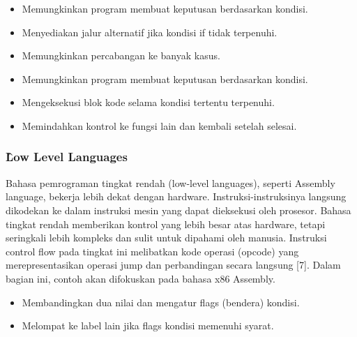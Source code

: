 
\begin{itemize}
	\item {} Memungkinkan program membuat keputusan berdasarkan kondisi.
	\item {} Menyediakan jalur alternatif jika kondisi if tidak terpenuhi.
	\item {} Memungkinkan percabangan ke banyak kasus.
\end{itemize}


\begin{itemize}
	\item {} Memungkinkan program membuat keputusan berdasarkan kondisi.
	\item {} Mengeksekusi blok kode selama kondisi tertentu terpenuhi.
\end{itemize}


\begin{itemize}
	\item {} Memindahkan kontrol ke fungsi lain dan kembali setelah selesai.
\end{itemize}

\subsubsection{\f{Low Level Languages}}
Bahasa pemrograman tingkat rendah (low-level languages), seperti Assembly language, bekerja lebih dekat dengan hardware. Instruksi-instruksinya langsung dikodekan ke dalam instruksi mesin yang dapat dieksekusi oleh prosesor. Bahasa tingkat rendah memberikan kontrol yang lebih besar atas hardware, tetapi seringkali lebih kompleks dan sulit untuk dipahami oleh manusia. Instruksi control flow pada tingkat ini melibatkan kode operasi (opcode) yang merepresentasikan operasi jump dan perbandingan secara langsung [7]. Dalam bagian ini, contoh akan difokuskan pada bahasa x86 Assembly.


\begin{itemize}
	\item {} Membandingkan dua nilai dan mengatur flags (bendera) kondisi.
	\item {} Melompat ke label lain jika flags kondisi memenuhi syarat.
\end{itemize}

